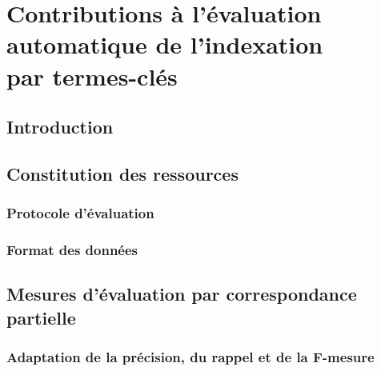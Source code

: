 \chapter[Contributions à l'évaluation automatique de l'indexation par termes-clés]{Contributions à l'évaluation automatique de l'indexation\\par termes-clés}
\label{chap:main-automatic_evaluation_of_keyphrase_annotation}
  \section{Introduction}
  \label{sec:main-automatic_evaluation_of_keyphrase_annotation-introduction}


  \section{Constitution des ressources}
  \label{section:main-automatic_evaluation_of_keyphrase_annotation-resource_construction}
    \subsection{Protocole d'évaluation}
    \label{subsec:main-automatic_evaluation_of_keyphrase_annotation-resource_construction-evaluation_protocol}

    \subsection{Format des données}
    \label{subsec:main-automatic_evaluation_of_keyphrase_annotation-resource_construction-data_format}


  \section{Mesures d'évaluation par correspondance partielle}
  \label{sec:main-automatic_evaluation_of_keyphrase_annotation-evaluation}
    \subsection{Adaptation de la précision, du rappel et de la F-mesure}
    \label{subsec:main-automatic_evaluation_of_keyphrase_annotation-contributions-evaluation-soft_maching_precision_recall_and_f_measure}

